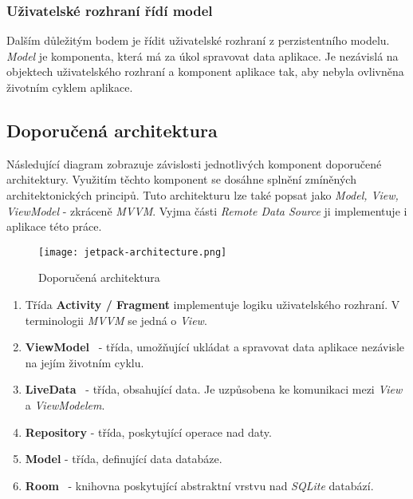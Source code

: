         \subsubsection{Uživatelské rozhraní řídí model}
        Dalším důležitým bodem je řídit uživatelské rozhraní z perzistentního modelu. \emph{Model} je komponenta, která má za úkol spravovat data aplikace. Je nezávislá na objektech uživatelského rozhraní a komponent aplikace tak, aby nebyla ovlivněna životním cyklem aplikace.

        \newpage
        \subsection{Doporučená architektura}
        Následující diagram zobrazuje závislosti jednotlivých komponent doporučené architektury. Využitím těchto komponent se dosáhne splnění zmíněných architektonických principů. Tuto architekturu lze také popsat jako \emph{Model, View, ViewModel} - zkráceně \emph{MVVM}. Vyjma části \emph{Remote Data Source} ji implementuje i aplikace této práce.

        \begin{figure}[h!]
            \centering
            \vspace{0.5cm}
            \texttt{[image: jetpack-architecture.png]}
            \caption[Architektura aplikace]{Doporučená architektura~\cite{app-architecture-guide}}
            \label{diagram:jetpack_arch}
        \end{figure}
        
        \begin{enumerate}
            \item Třída \textbf{Activity / Fragment} implementuje logiku uživatelského rozhraní. V terminologii \emph{MVVM} se jedná o \emph{View}.
            \item \textbf{ViewModel}~ - třída, umožňující ukládat a spravovat data aplikace nezávisle na jejím životním cyklu.\label{arch:viewmodel}
            \item \textbf{LiveData}~\cite{livedata} - třída, obsahující data. Je uzpůsobena ke komunikaci mezi \emph{View} a \emph{ViewModelem}. 
            \item \textbf{Repository} - třída, poskytující operace nad daty.
            \item \textbf{Model} - třída, definující data databáze.
            \item \textbf{Room}~ - knihovna poskytující abstraktní vrstvu nad \emph{SQLite} databází.
        \end{enumerate}

